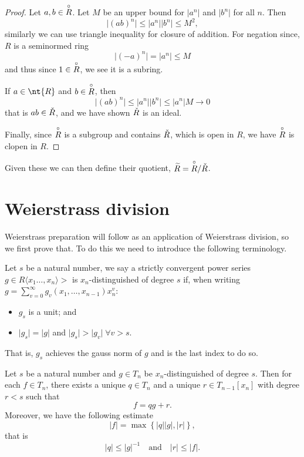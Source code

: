 \begin{proof}
  Let $a, b \in \overset{\circ}{R}$. Let $M$ be an upper bound for $\lvert a^n \rvert$ and $\lvert b^n \rvert$
  for all $n$. Then
  \[
  \lvert (a b )^n \rvert \leq \lvert a^n \rvert \lvert b^n \rvert \leq M^2,
  \]
  similarly we can use triangle inequality for closure of addition.
  For negation since, $R$ is a seminormed ring
  \[
  \lvert (- a)^n \rvert = \lvert a^n \rvert \leq M
  \]
  and thus since $1 \in \overset{\circ}{R}$, we see it is a subring.

  If $a \in \nt{R}$ and $b \in \overset{\circ}{R}$, then
  \[
  \lvert (a b)^n \rvert \leq \lvert a^n \rvert \lvert b^n \rvert \leq \lvert a^n \rvert M \to 0
  \]
  that is $ a b \in \check{R}$, and we have shown $\check{R}$ is an ideal.

  Finally, since $\overset{\circ}{R}$ is a subgroup and contains $\check{R}$, which is open in $R$, we have $\overset{\circ}{R}$
  is clopen in $R$.
\end{proof}

Given these we can then define their quotient, $\widetilde{R} = \overset{\circ}{R} / \check{R}$.

\section{Weierstrass division}

Weierstrass preparation will follow as an application of Weierstrass division, so we first prove that.
To do this we need to introduce the following terminology.


\begin{definition}
  Let $s$ be a natural number, we say a strictly convergent power series
  $g \in R \langle x_1 \dots, x_n \rangle >$ is $x_n$-distinguished
  of degree $s$ if, when writing $g = \sum_{v = 0}^\infty g_v(x_1, \dots, x_{n-1}) x_n^v$:
  \begin{itemize}
    \item $g_s$ is a unit; and
    \item $ \lvert g_s \rvert = \lvert g \rvert$ and $\lvert g_s \rvert > \lvert g_v \rvert \; \forall
      v > s$.
  \end{itemize}
\end{definition}

That is, $g_s$ achieves the gauss norm of $g$ and is the last index to do so.

\begin{theorem}
  Let $s$ be a natural number and $g \in T_n$ be $x_n$-distinguished of degree $s$. Then for each
  $f \in T_n$, there exists a unique $ q \in T_n$ and a unique $r \in T_{n-1}[x_n]$ with degree
  $r < s$ such that
  \[
    f = q g + r.
  \]
  Moreover, we have the following estimate
  \[
    \lvert f \rvert = \max \left\{ \lvert q \rvert \lvert g \rvert, \lvert r \rvert \right\},
  \]
  that is
  \[
    \lvert q \rvert \leq \lvert g \rvert^{-1} \quad \text{and} \quad \lvert r \rvert \leq \lvert f \rvert.
  \]
\end{theorem}

